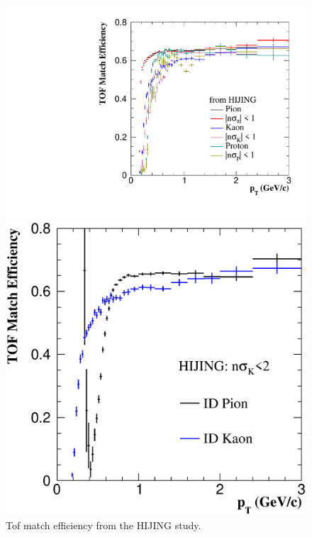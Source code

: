 \begin{figure}[htbp]
\begin{minipage}[htbp]{0.52\linewidth}
\centering
\includegraphics[width=1.0\textwidth]{figure/Run14_D0HFT/TofMatchEff_Hijing.pdf}
\end{minipage}
\hfill
\begin{minipage}[htbp]{0.52\linewidth}
\centering
\includegraphics[width=1.0\textwidth]{figure/Run14_D0HFT/TofMatchEff_petr.eps} 
\end{minipage}
\caption{Tof match efficiency from the HIJING study. \label{fig:tofMatch_Hijing}}
\end{figure}


